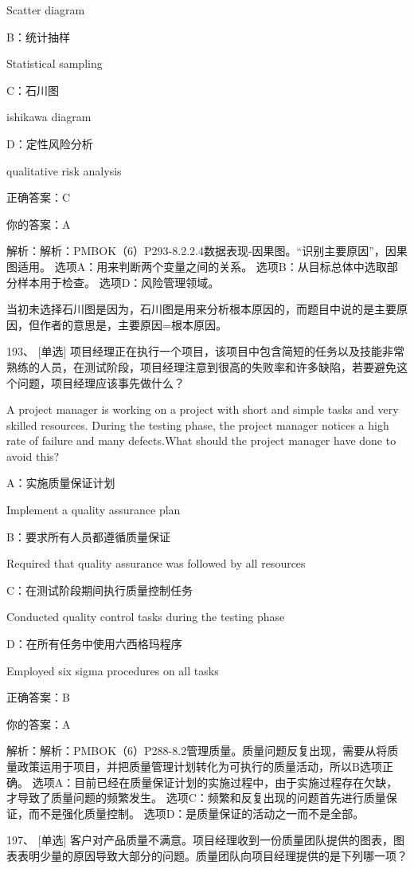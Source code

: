 Scatter diagram

B：统计抽样

Statistical sampling

C：石川图

ishikawa diagram

D：定性风险分析

qualitative risk analysis

正确答案：C

你的答案：A

解析：解析：PMBOK（6）P293-8.2.2.4数据表现-因果图。“识别主要原因”，因果图适用。 选项A：用来判断两个变量之间的关系。 选项B：从目标总体中选取部分样本用于检查。 选项D：风险管理领域。

当初未选择石川图是因为，石川图是用来分析根本原因的，而题目中说的是主要原因，但作者的意思是，主要原因=根本原因。



193、 [单选] 项目经理正在执行一个项目，该项目中包含简短的任务以及技能非常熟练的人员，在测试阶段，项目经理注意到很高的失败率和许多缺陷，若要避免这个问题，项目经理应该事先做什么？

A project manager is working on a project with short and simple tasks and very skilled resources. During the testing phase, the project manager notices a high rate of failure and many defects.What should the project manager have done to avoid this?

A：实施质量保证计划

Implement a quality assurance plan

B：要求所有人员都遵循质量保证

Required that quality assurance was followed by all resources

C：在测试阶段期间执行质量控制任务

Conducted quality control tasks during the testing phase

D：在所有任务中使用六西格玛程序

Employed six sigma procedures on all tasks

正确答案：B

你的答案：A

解析：解析：PMBOK（6）P288-8.2管理质量。质量问题反复出现，需要从将质量政策运用于项目，并把质量管理计划转化为可执行的质量活动，所以B选项正确。 选项A：目前已经在质量保证计划的实施过程中，由于实施过程存在欠缺，才导致了质量问题的频繁发生。 选项C：频繁和反复出现的问题首先进行质量保证，而不是强化质量控制。 选项D：是质量保证的活动之一而不是全部。


197、 [单选] 客户对产品质量不满意。项目经理收到一份质量团队提供的图表，图表表明少量的原因导致大部分的问题。质量团队向项目经理提供的是下列哪一项？

